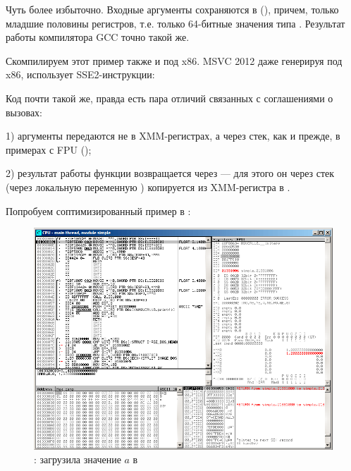 

Чуть более избыточно. 
Входные аргументы сохраняются в  (), 
причем, только младшие половины регистров, т.е. только 64-битные значения типа \Tdouble{}.
Результат работы компилятора GCC точно такой же.


Скомпилируем этот пример также и под x86. MSVC 2012 даже генерируя под x86, использует SSE2-инструкции:





Код почти такой же, правда есть пара отличий связанных с соглашениями о вызовах:

1) аргументы передаются не в XMM-регистрах, а через стек, как и прежде, в примерах с FPU ();

2) результат работы функции возвращается через  --- для этого он через стек
(через локальную переменную ) копируется из XMM-регистра в .

\clearpage
Попробуем соптимизированный пример в \olly:

\begin{figure}[H]
\centering
\includegraphics[scale=\FigScale]{patterns/205_floating_SIMD/simple_olly1.png}
\caption{\olly:  загрузила значение $a$ в }
\label{fig:FPU_SIMD_simple_olly1}
\end{figure}

